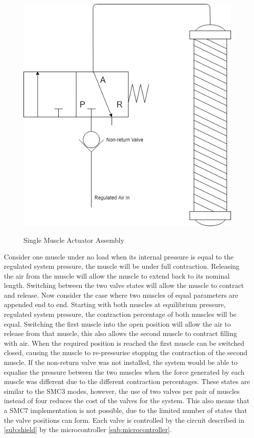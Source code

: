 \documentclass[11pt,a4paper]{article}
\begin{document}
\begin{figure}[hbt!]
    \centering
    \caption{Single Muscle Actuator Assembly}
    \includegraphics[scale=0.3]{Pneumatic_Design.png}
    \label{fig:pneumatic_valve}
\end{figure}

Consider one muscle under no load when its internal pressure is equal to the regulated system pressure, the muscle will be under full contraction. Releasing the air from the muscle will allow the muscle to extend back to its nominal length. Switching between the two valve states will allow the muscle to contract and release. Now consider the case where two muscles of equal parameters are appended end to end. Starting with both muscles at equilibrium pressure, regulated system pressure, the contraction percentage of both muscles will be equal. Switching the first muscle into the open position will allow the air to release from that muscle, this also allows the second muscle to contract filling with air. When the required position is reached the first muscle can be switched closed, causing the muscle to re-pressurise stopping the contraction of the second muscle. If the non-return valve was not installed, the system would be able to equalise the pressure between the two muscles when the force generated by each muscle was different due to the different contraction percentages. These states are similar to the SMC3 modes, however, the use of two valves per pair of muscles instead of four reduces the cost of the valves for the system. This also means that a SMC7 implementation is not possible, due to the limited number of states that the valve positions can form.
Each valve is controlled by the circuit described in \ref{sub:shield} by the microcontroller \ref{sub:microcontroller}.
\end{document}
